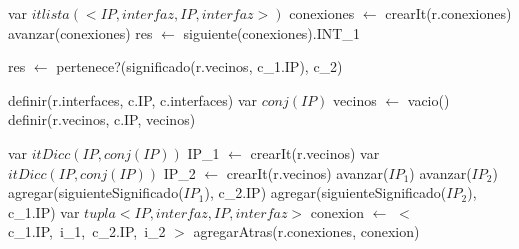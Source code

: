 \begin{algorithm}\phantom{[H]}
\begin{algorithmic}[1]
 
  \State var $itlista(<IP, interfaz, IP, interfaz>)$ conexiones $\gets$ crearIt(r.conexiones)  
   
    \State avanzar(conexiones) 
  \EndWhile
  \State res $\gets$ siguiente(conexiones).INT_{1} 
\EndFunction
\end{algorithmic}
\end{algorithm}


\begin{algorithm}\phantom{[H]}
\begin{algorithmic}[1]
 
  \State res $\gets$ pertenece?(significado(r.vecinos, c_{1}.IP), c_{2}) 
\EndFunction
\end{algorithmic}
\end{algorithm}

\begin{algorithm}\phantom{[H]}
\begin{algorithmic}[1]
 
  \State definir(r.interfaces, c.IP, c.interfaces)  
  \State var $conj(IP)$ vecinos $\gets$ vacio() 
  \State definir(r.vecinos, c.IP, vecinos) 
\EndFunction
\end{algorithmic}
\end{algorithm}

\begin{algorithm}\phantom{[H]}
\begin{algorithmic}[1]
 
  \State var $itDicc(IP,conj(IP))$ IP_{1} $\gets$ crearIt(r.vecinos)  
  \State var $itDicc(IP,conj(IP))$ IP_{2} $\gets$ crearIt(r.vecinos) 
   
    \State avanzar($IP_{1}$) 
  \EndWhile
   
    \State avanzar($IP_{2}$) 
  \EndWhile
  \State agregar(siguienteSignificado($IP_{1}$), c_{2}.IP) 
  \State agregar(siguienteSignificado($IP_{2}$), c_{1}.IP) 
  \State var $tupla<IP, interfaz, IP, interfaz>$ conexion $\gets$ $<$ c_{1}.IP,\ i_{1},\ c_{2}.IP,\ i_{2} $>$ 
  \State agregarAtras(r.conexiones, conexion) 
\EndFunction
\end{algorithmic}
\end{algorithm}

